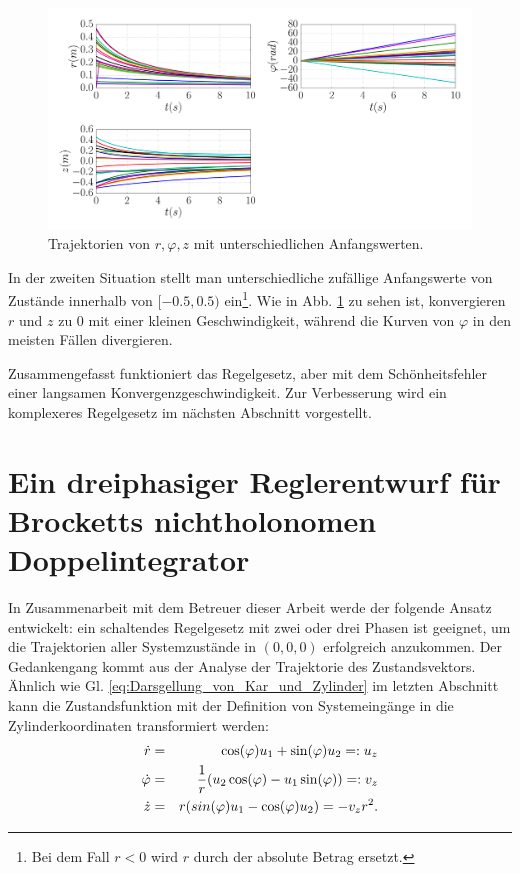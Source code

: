 \begin{figure}[!h]
	\centering
	\includegraphics[width=\linewidth]{bild/30_32/Brockett_e2_Switch.pdf}%
	\caption{Trajektorien von $r,\varphi,z$ mit unterschiedlichen Anfangswerten.}
	\label{fig:Brockett_e2_Switch}
\end{figure}

In der zweiten Situation stellt man unterschiedliche zufällige Anfangswerte von Zustände innerhalb von $[-0.5,0.5)$ ein\footnote{Bei dem Fall $r<0$ wird $r$ durch der absolute Betrag ersetzt.}. Wie in Abb. \ref{fig:Brockett_e2_Switch} zu sehen ist, konvergieren $r$ und $z$ zu $0$ mit einer kleinen Geschwindigkeit, während die Kurven von $\varphi$ in den meisten Fällen divergieren.

Zusammengefasst funktioniert das Regelgesetz, aber mit dem Schönheitsfehler einer langsamen Konvergenzgeschwindigkeit. Zur Verbesserung wird ein komplexeres Regelgesetz im nächsten Abschnitt vorgestellt.

\section{Ein dreiphasiger Reglerentwurf für Brocketts nichtholonomen Doppelintegrator}
\label{Ein_dreiphasiger_Reglerentwurf_für_den_Brocketts_nichtholonomischen_ Doppelintegrator}
In Zusammenarbeit mit dem Betreuer dieser Arbeit werde der folgende Ansatz entwickelt: ein schaltendes Regelgesetz mit zwei oder drei Phasen ist geeignet, um die Trajektorien aller Systemzustände in $(0,0,0)$  erfolgreich anzukommen. Der Gedankengang kommt aus der Analyse der Trajektorie des Zustandsvektors. Ähnlich wie Gl. \eqref{eq:Darsgellung_von_Kar_und_Zylinder} im letzten Abschnitt kann die Zustandsfunktion mit der Definition von Systemeingänge in die Zylinderkoordinaten transformiert werden:
\begin{eqnarray}
\dot{r} &=& \cos(\varphi)u_{1} + \sin(\varphi)u_{2} =:u_{z}\notag\\
\dot{\varphi} &=& \frac{1}{r}(u_{2}\cos(\varphi)-u_{1}\sin(\varphi)) =: v_{z}\notag\\
\dot{z} &=& r(sin(\varphi)u_{1}-\cos(\varphi)u_{2})= -v_{z}r^{2}.
\label{eq:Ableitung_r_phi_z_in_Zylinderachse}
\end{eqnarray}

